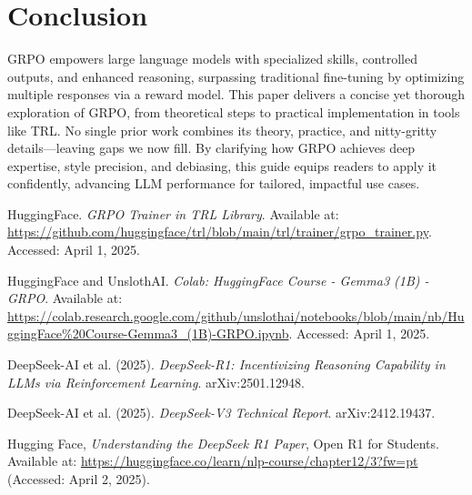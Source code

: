 \documentclass{article}
\begin{document}
\section{Conclusion}
GRPO empowers large language models with specialized skills, controlled outputs, and enhanced reasoning, surpassing traditional fine-tuning by optimizing multiple responses via a reward model. This paper delivers a concise yet thorough exploration of GRPO, from theoretical steps to practical implementation in tools like TRL. No single prior work combines its theory, practice, and nitty-gritty details—leaving gaps we now fill. By clarifying how GRPO achieves deep expertise, style precision, and debiasing, this guide equips readers to apply it confidently, advancing LLM performance for tailored, impactful use cases.
\begin{thebibliography}{9}

HuggingFace. \textit{GRPO Trainer in TRL Library}. Available at: \url{https://github.com/huggingface/trl/blob/main/trl/trainer/grpo_trainer.py}. Accessed: April 1, 2025.

HuggingFace and UnslothAI. \textit{Colab: HuggingFace Course - Gemma3 (1B) - GRPO}. Available at: \url{https://colab.research.google.com/github/unslothai/notebooks/blob/main/nb/HuggingFace%20Course-Gemma3_(1B)-GRPO.ipynb}. Accessed: April 1, 2025.

DeepSeek-AI et al. (2025). \textit{DeepSeek-R1: Incentivizing Reasoning Capability in LLMs via Reinforcement Learning}. arXiv:2501.12948.

DeepSeek-AI et al. (2025). \textit{DeepSeek-V3 Technical Report}. arXiv:2412.19437.

Hugging Face, \textit{Understanding the DeepSeek R1 Paper}, Open R1 for Students. Available at: \url{https://huggingface.co/learn/nlp-course/chapter12/3?fw=pt} (Accessed: April 2, 2025).



\end{thebibliography}
\end{document}
